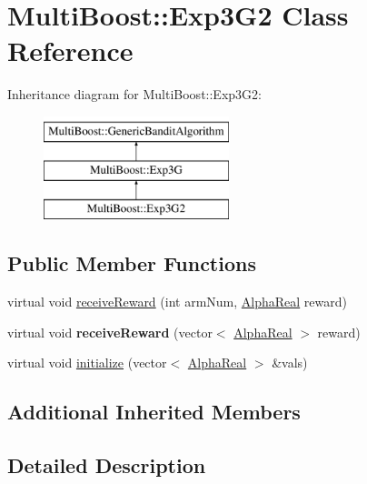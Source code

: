 \hypertarget{classMultiBoost_1_1Exp3G2}{\section{Multi\-Boost\-:\-:Exp3\-G2 Class Reference}
\label{classMultiBoost_1_1Exp3G2}
}
Inheritance diagram for Multi\-Boost\-:\-:Exp3\-G2\-:\begin{figure}[H]
\begin{center}
\leavevmode
\includegraphics[height=3.000000cm]{classMultiBoost_1_1Exp3G2}
\end{center}
\end{figure}
\subsection*{Public Member Functions}
\begin{DoxyCompactItemize}
\item 
virtual void \hyperlink{classMultiBoost_1_1Exp3G2_a63a055c95b7dddd9bc513d1d78ef0aa4}{receive\-Reward} (int arm\-Num, \hyperlink{Defaults_8h_a80184c4fd10ab70a1a17c5f97dcd1563}{Alpha\-Real} reward)
\item 
\hypertarget{classMultiBoost_1_1Exp3G2_a497f296e281816d20cb3b0c4e32468af}{virtual void {\bfseries receive\-Reward} (vector$<$ \hyperlink{Defaults_8h_a80184c4fd10ab70a1a17c5f97dcd1563}{Alpha\-Real} $>$ reward)}\label{classMultiBoost_1_1Exp3G2_a497f296e281816d20cb3b0c4e32468af}

\item 
virtual void \hyperlink{classMultiBoost_1_1Exp3G2_a7851b4a11591d7fcd89cca93d81e9f87}{initialize} (vector$<$ \hyperlink{Defaults_8h_a80184c4fd10ab70a1a17c5f97dcd1563}{Alpha\-Real} $>$ \&vals)
\end{DoxyCompactItemize}
\subsection*{Additional Inherited Members}


\subsection{Detailed Description}


